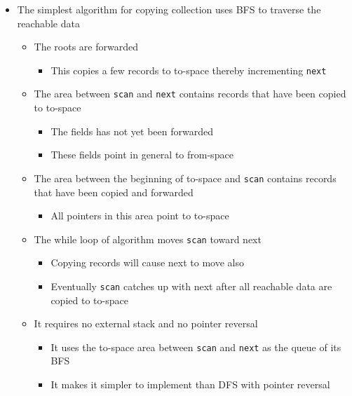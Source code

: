 \documentclass[11pt]{article}
\begin{document}
\begin{itemize}
\item The simplest algorithm for copying collection uses BFS to traverse the reachable data 
\begin{itemize}
\item The roots are forwarded
\begin{itemize}
\item This copies a few records to to-space thereby incrementing \texttt{next}
\end{itemize}
\item The area between \texttt{scan} and \texttt{next} contains records that have been copied to to-space
\begin{itemize}
\item The fields has not yet been forwarded
\item These fields point in general to from-space
\end{itemize}
\item The area between the beginning of to-space and \texttt{scan} contains records that have been copied and forwarded
\begin{itemize}
\item All pointers in this area point to to-space
\end{itemize}
\item The while loop of algorithm moves \texttt{scan} toward next
\begin{itemize}
\item Copying records will cause next to move also
\item Eventually \texttt{scan} catches up with next after all reachable data are copied to to-space
\end{itemize}
\item It requires no external stack and no pointer reversal
\begin{itemize}
\item It uses the to-space area between \texttt{scan} and \texttt{next} as the queue of its BFS
\item It makes it simpler to implement than DFS with pointer reversal
\end{itemize}
\end{itemize}
\end{itemize}
\end{document}
